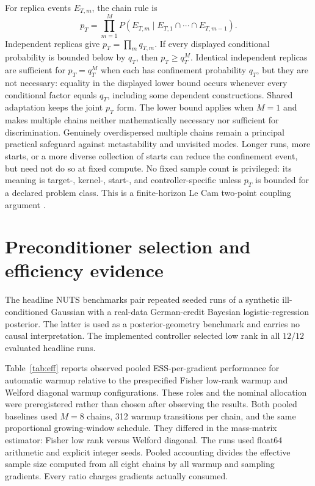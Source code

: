 \documentclass[11pt]{article}
\theoremstyle{plain}
\theoremstyle{definition}
\theoremstyle{remark}
\begin{document}
For replica events $E_{T,m}$, the chain rule is
\[
 p_T=\prod_{m=1}^M
 P(E_{T,m}\mid E_{T,1}\cap\cdots\cap E_{T,m-1}).
\]
Independent replicas give $p_T=\prod_m q_{T,m}$. If every displayed
conditional probability is bounded below by $q_T$, then
$p_T\ge q_T^M$. Identical independent replicas are sufficient for
$p_T=q_T^M$ when each has confinement probability $q_T$, but they are not
necessary: equality in the displayed lower bound occurs whenever every
conditional factor equals $q_T$, including some dependent constructions.
Shared adaptation keeps the joint $p_T$ form. The lower bound applies when
$M=1$ and makes multiple chains neither mathematically necessary nor
sufficient for discrimination. Genuinely overdispersed multiple chains remain
a principal practical safeguard against metastability and unvisited modes.
Longer runs, more starts, or a more diverse collection of starts can reduce the
confinement event, but need not do so at fixed compute.
No fixed sample count is privileged: its meaning is target-, kernel-, start-,
and controller-specific unless $p_T$ is bounded for a declared problem class.
This is a finite-horizon Le Cam two-point coupling argument
\citep{yu1997assouad}.

\section{Preconditioner selection and efficiency evidence}\label{sec:efficiency}

The headline NUTS benchmarks pair repeated seeded runs of a synthetic
ill-conditioned Gaussian with a real-data German-credit Bayesian
logistic-regression posterior. The latter is used as a posterior-geometry
benchmark and carries no causal interpretation. The implemented controller
selected low rank in all $12/12$ evaluated headline runs.

Table~\ref{tab:eff} reports observed pooled ESS-per-gradient performance for
automatic warmup relative to the prespecified Fisher low-rank warmup and
Welford diagonal warmup configurations. These roles and the nominal allocation
were preregistered rather than chosen after observing the results. Both pooled
baselines used $M=8$ chains, 312 warmup transitions per chain, and the same
proportional growing-window schedule. They differed in the mass-matrix
estimator: Fisher low rank versus Welford diagonal. The runs used float64
arithmetic and explicit integer seeds. Pooled accounting divides the effective
sample size computed from all eight chains by all warmup and sampling
gradients. Every ratio charges gradients actually consumed.
\end{document}
